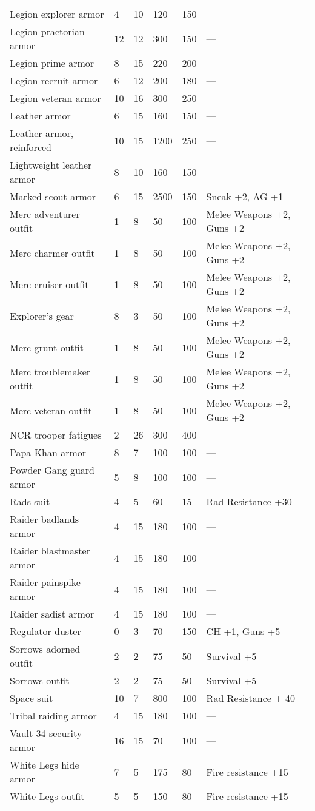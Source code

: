 \begin{longtable}{|p{4cm}|p{1.2cm}|p{1.2cm}|p{1.2cm}|p{1.2cm}|p{4cm}|}
Legion explorer armor & 4 & 10 & 120 & 150 & — \\
Legion praetorian armor & 12 & 12 & 300 & 150 & — \\
Legion prime armor & 8 & 15 & 220 & 200 & — \\
Legion recruit armor & 6 & 12 & 200 & 180 & — \\
Legion veteran armor & 10 & 16 & 300 & 250 & — \\
Leather armor & 6 & 15 & 160 & 150 & — \\
Leather armor, reinforced & 10 & 15 & 1200 & 250 & — \\
Lightweight leather armor & 8 & 10 & 160 & 150 & — \\
Marked scout armor & 6 & 15 & 2500 & 150 & Sneak +2, AG +1 \\
Merc adventurer outfit & 1 & 8 & 50 & 100 & Melee Weapons +2, Guns +2 \\
Merc charmer outfit & 1 & 8 & 50 & 100 & Melee Weapons +2, Guns +2 \\
Merc cruiser outfit & 1 & 8 & 50 & 100 & Melee Weapons +2, Guns +2 \\
Explorer's gear & 8 & 3 & 50 & 100 & Melee Weapons +2, Guns +2 \\
Merc grunt outfit & 1 & 8 & 50 & 100 & Melee Weapons +2, Guns +2 \\
Merc troublemaker outfit & 1 & 8 & 50 & 100 & Melee Weapons +2, Guns +2 \\
Merc veteran outfit & 1 & 8 & 50 & 100 & Melee Weapons +2, Guns +2 \\
NCR trooper fatigues & 2 & 26 & 300 & 400 & — \\
Papa Khan armor & 8 & 7 & 100 & 100 & — \\
Powder Gang guard armor & 5 & 8 & 100 & 100 & — \\
Rads suit & 4 & 5 & 60 & 15 & Rad Resistance +30 \\
Raider badlands armor & 4 & 15 & 180 & 100 & — \\
Raider blastmaster armor & 4 & 15 & 180 & 100 & — \\
Raider painspike armor & 4 & 15 & 180 & 100 & — \\
Raider sadist armor & 4 & 15 & 180 & 100 & — \\
Regulator duster & 0 & 3 & 70 & 150 & CH +1, Guns +5 \\
Sorrows adorned outfit & 2 & 2 & 75 & 50 & Survival +5 \\
Sorrows outfit & 2 & 2 & 75 & 50 & Survival +5 \\
Space suit & 10 & 7 & 800 & 100 & Rad Resistance + 40 \\
Tribal raiding armor & 4 & 15 & 180 & 100 & — \\
Vault 34 security armor & 16 & 15 & 70 & 100 & — \\
White Legs hide armor & 7 & 5 & 175 & 80 & Fire resistance +15 \\
White Legs outfit & 5 & 5 & 150 & 80 & Fire resistance +15 \\
\hline
\end{longtable}
